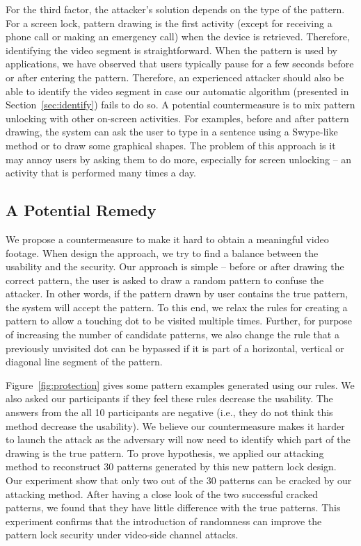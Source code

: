 For the third factor, the attacker's solution depends on the type of the
pattern. For a screen lock, pattern drawing is the first activity (except for
receiving a phone call or making an emergency call) when the device is
retrieved. Therefore, identifying the video segment is straightforward. When
the pattern is used by applications, we have observed that users typically
pause for a few seconds before or after entering the pattern. Therefore, an
experienced attacker should also be able to identify the video segment in
case our automatic algorithm (presented in Section~\ref{sec:identify}) fails
to do so. A potential countermeasure is to mix pattern unlocking with other
on-screen activities. For examples, before and after pattern drawing, the
system can ask the user to type in a sentence using a Swype-like method or to
draw some graphical shapes. The problem of this approach is it may annoy
users by asking them to do more, especially for screen unlocking -- an
activity that is performed
many times a day.


\subsection{A Potential Remedy}
We propose a countermeasure to make it hard to obtain a meaningful video footage.
When design the approach, we try to find a balance between the usability and the security.
Our approach is simple --
before or after drawing the correct pattern, the user is asked to draw a random pattern to confuse the attacker. In
other words, if the pattern drawn by user contains the true pattern, the system will accept the pattern. To this
end, we relax the rules for creating a pattern to allow a touching dot to be visited multiple times. Further, for
purpose of increasing the number of candidate patterns, we also change the rule that a previously unvisited dot can be
bypassed if it is part of a horizontal, vertical or diagonal line segment of the pattern.


Figure~\ref{fig:protection} gives some pattern examples generated using our rules. We also asked our participants if they feel these rules decrease
the usability. The answers from the all 10 participants are negative (i.e., they do not think this method decrease the usability).
We believe our countermeasure makes it harder to launch the attack as the adversary will now need to
identify which part of the drawing is the true pattern.
To prove hypothesis, we applied our attacking method to reconstruct 30 patterns generated by this new pattern lock design.
Our experiment show that only two out of the 30 patterns can be cracked by our attacking method.
After having a close look of the two successful cracked patterns, we found that they have little difference with the true patterns.
This experiment confirms that the introduction of randomness can improve the pattern lock security under video-side channel attacks.

